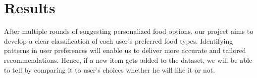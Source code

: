 \documentclass[conference]{IEEEtran}
\begin{document}
\section{Results}
After multiple rounds of suggesting personalized food options, our project aims to develop a clear classification of each user's preferred food types. Identifying patterns in user preferences will enable us to deliver more accurate and tailored recommendations. Hence, if a new item gets added to the dataset, we will be able to tell by comparing it to user’s choices whether he will like it or not.
\end{document}
